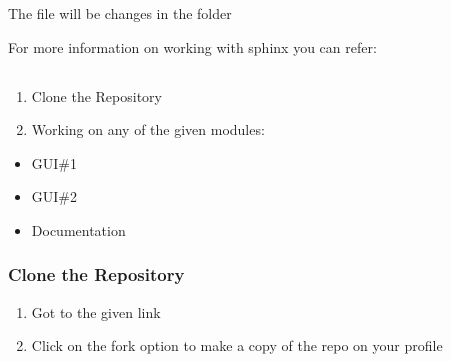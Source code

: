\documentclass[letterpaper,10pt,english]{sphinxmanual}
\begin{document}
\begin{sphinxVerbatim}[commandchars=\\\{\}]
 
 
\end{sphinxVerbatim}

The file will be changes in the  folder

For more information on working with sphinx you can refer:


\subsection{}
\label{\detokenize{developer:working-on-the-project}}\begin{enumerate}
%
\item {} 
Clone the Repository

\item {} 
Working on any of the given modules:

\end{enumerate}
\begin{itemize}
\item {} 
GUI\#1

\item {} 
GUI\#2

\item {} 
Documentation

\end{itemize}


\subsubsection{Clone the Repository}
\label{\detokenize{developer:clone-the-repository}}\begin{enumerate}
%
\item {} \begin{description}
\item[{Got to the given link}] \leavevmode
{}

\end{description}

\item {} 
Click on the fork option to make a copy of the repo on your profile

\end{enumerate}
\end{document}
